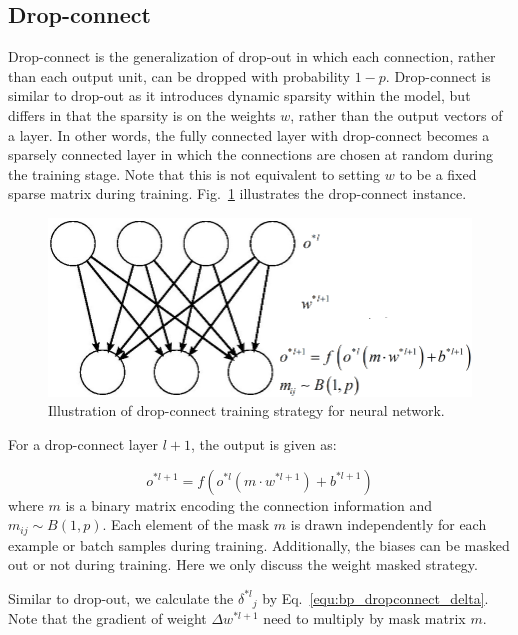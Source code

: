 \documentclass[runningheads,openany]{xhlPaper}
\begin{document}
\subsection{Drop-connect}
Drop-connect\cite{LiWan_Dropconnect_2013} is the generalization of drop-out in which each connection, rather than each output unit, can be dropped with probability $1 - p$. Drop-connect is similar to drop-out as it introduces dynamic sparsity within the model, but differs in that the sparsity is on the weights $w$, rather than the output vectors of a layer. In other words, the fully connected layer with drop-connect becomes a sparsely connected layer in which the connections are chosen at random during the training stage. Note that this is not equivalent to setting $w$ to be a fixed sparse matrix during training. 
Fig.~\ref{fig:bp_dropconnect} illustrates the drop-connect instance.

\begin{figure}
\centering
\includegraphics[width=0.85\linewidth]{dropconnect}
\caption{Illustration of drop-connect training strategy for neural network.}
\label{fig:bp_dropconnect}
\end{figure}

For a drop-connect layer $l + 1$, the output is given as:

\begin{equation}
\label{equ:bp_dropconnect_layer_output}
{o^{*l + 1}} = f\left( {{o^{*l}}\left( {m \cdot {w^{*l + 1}}} \right) + {b^{*l + 1}}} \right)
\end{equation}
where $m$ is a binary matrix encoding the connection information and ${m_{ij}} \sim B\left( {1,p} \right)$. Each element of the mask $m$ is drawn independently for each example or batch samples during training. Additionally, the biases can be masked out or not during training. Here we only discuss the weight masked strategy.

Similar to drop-out, we calculate the ${\delta ^{*l}}_j$ by Eq.~\ref{equ:bp_dropconnect_delta}. Note that the gradient of weight $\Delta w^{*l + 1}$ need to multiply by mask matrix $m$.
\end{document}
